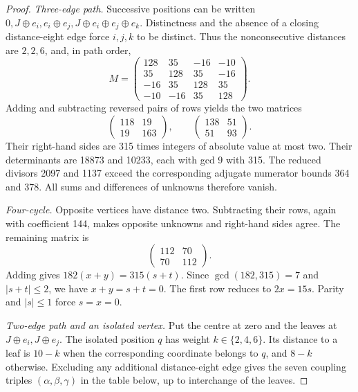 \begin{proof}
\smallskip\noindent\emph{Three-edge path.}
Successive positions can be written
$0,J\oplus e_i,e_i\oplus e_j,J\oplus e_i\oplus e_j\oplus e_k$.
Distinctness and the absence of a closing distance-eight edge force
$i,j,k$ to be distinct. Thus the nonconsecutive distances are $2,2,6$,
and, in path order,
\[
M=\begin{pmatrix}
128&35&-16&-10\\35&128&35&-16\\
-16&35&128&35\\-10&-16&35&128
\end{pmatrix}.
\]
Adding and subtracting reversed pairs of rows yields the two matrices
\[
\begin{pmatrix}118&19\\19&163\end{pmatrix},\qquad
\begin{pmatrix}138&51\\51&93\end{pmatrix}.
\]
Their right-hand sides are 315 times integers of absolute value at
most two. Their determinants are 18873 and 10233, each with gcd 9 with
315. The reduced divisors 2097 and 1137 exceed the corresponding
adjugate numerator bounds 364 and 378. All sums and differences of
unknowns therefore vanish.

\smallskip\noindent\emph{Four-cycle.}
Opposite vertices have distance two. Subtracting their rows, again
with coefficient 144, makes opposite unknowns and right-hand sides
agree. The remaining matrix is
\[
\begin{pmatrix}112&70\\70&112\end{pmatrix}.
\]
Adding gives $182(x+y)=315(s+t)$. Since $\gcd(182,315)=7$ and
$|s+t|\le2$, we have $x+y=s+t=0$. The first row reduces to
$2x=15s$. Parity and $|s|\le1$ force $s=x=0$.

\smallskip\noindent\emph{Two-edge path and an isolated vertex.}
Put the centre at zero and the leaves at $J\oplus e_i,J\oplus e_j$.
The isolated position $q$ has weight $k\in\{2,4,6\}$. Its distance to
a leaf is $10-k$ when the corresponding coordinate belongs to $q$,
and $8-k$ otherwise. Excluding any additional distance-eight edge
gives the seven coupling triples $(\alpha,\beta,\gamma)$ in the table
below, up to interchange of the leaves.


\end{proof}
